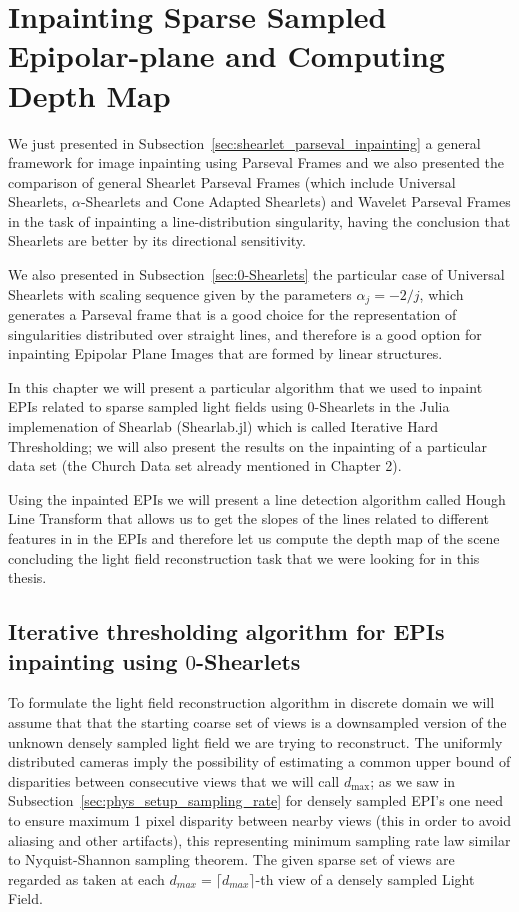 \chapter{Inpainting Sparse Sampled Epipolar-plane and Computing Depth Map}
\label{chap:Inpainting_sparse}

We just presented in Subsection~\ref{sec:shearlet_parseval_inpainting} a general framework for image inpainting using Parseval Frames and we also presented the comparison of general Shearlet Parseval Frames (which include Universal Shearlets, $\alpha$-Shearlets and Cone Adapted Shearlets) and Wavelet Parseval Frames in the task of inpainting a line-distribution singularity, having the conclusion that Shearlets are better by its directional sensitivity.

\bigskip

We also presented in Subsection~\ref{sec:0-Shearlets} the particular case of Universal Shearlets with scaling sequence given by the parameters $\alpha_j=-2/j$, which generates a Parseval frame that is a good choice for the representation of singularities distributed over straight lines, and therefore is a good option for inpainting Epipolar Plane Images that are formed by linear structures.

\bigskip

In this chapter we will present a particular algorithm that we used to inpaint EPIs related to sparse sampled light fields using $0$-Shearlets in the Julia implemenation of Shearlab (Shearlab.jl) which is called Iterative Hard Thresholding; we will also present the results on the inpainting of a particular data set (the Church Data set already mentioned in Chapter 2). 

\bigskip

Using the inpainted EPIs we will present a line detection algorithm called Hough Line Transform that allows us to get the slopes of the lines related to different features in in the EPIs and therefore let us compute the depth map of the scene concluding the light field reconstruction task that we were looking for in this thesis. 

\section{Iterative thresholding algorithm for EPIs inpainting using $0$-Shearlets}

To formulate the light field reconstruction algorithm in discrete domain we will assume that that the starting coarse set of views is a downsampled version of the unknown densely sampled light field we are trying to reconstruct. The uniformly distributed cameras imply the possibility of estimating a common upper bound of disparities between consecutive views that we will call $d_{\text{max}}$; as we saw in Subsection~\ref{sec:phys_setup_sampling_rate} for densely sampled EPI's one need to ensure maximum 1 pixel disparity between nearby views (this in order to avoid aliasing and other artifacts), this representing minimum sampling rate law similar to Nyquist-Shannon sampling theorem. The given sparse set of views are regarded as taken at each $d_{max}=\lceil d_{max}\rceil$-th view of a densely sampled Light Field. 

